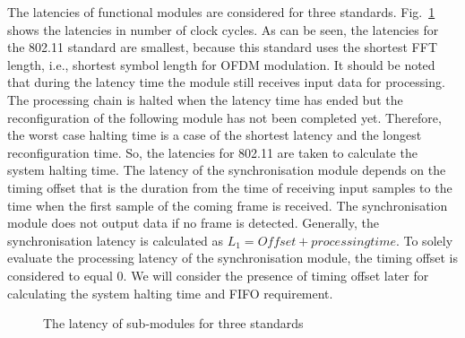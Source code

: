 The latencies of functional modules are considered for three standards. Fig.~\ref{fig:Latency} shows the latencies in number of clock cycles. As can be seen, the latencies for the 802.11 standard are smallest, because this standard uses the shortest FFT length, i.e., shortest symbol length for OFDM modulation. It should be noted that during the latency time the module still receives input data for processing. The processing chain is halted when the latency time has ended but the reconfiguration of the following module has not been completed yet. Therefore, the worst case halting time is a case of the shortest latency and the longest reconfiguration time. So, the latencies for 802.11 are taken to calculate the system halting time. The latency of the synchronisation module depends on the timing offset that is the duration from the time of receiving input samples to the time when the first sample of the coming frame is received. The synchronisation module does not output data if no frame is detected. Generally, the synchronisation latency is calculated as $L_{1} = Offset + processing time$.  To solely evaluate the processing latency of the synchronisation module, the timing offset is considered to equal 0. We will consider the presence of timing offset later for calculating the system halting time and FIFO requirement.
\begin{figure}
\centering
{}
\caption{The latency of sub-modules for three standards}
\label{fig:Latency}
\end{figure}

